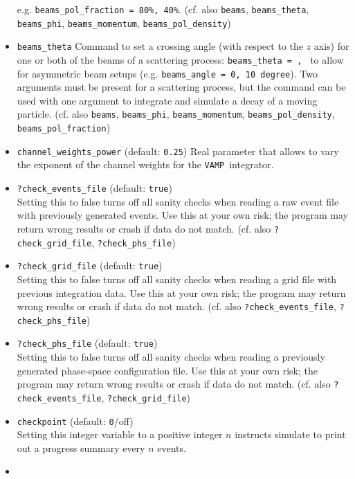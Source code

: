 \documentclass[12pt]{book}
\newcommand{\ttt}[1]{\texttt{#1}}
\newcommand{\vamp}{\texttt{VAMP}}
\begin{document}
\begin{itemize}
e.g. \ttt{beams\_pol\_fraction = 80\%, 40\%}. (cf. also \ttt{beams},
\ttt{beams\_theta}, \ttt{beams\_phi}, \ttt{beams\_momentum},
\ttt{beams\_pol\_density})
\item
\ttt{beams\_theta} \newline
Command to set a crossing angle (with respect to the $z$ axis) for one
or both of the beams of a 
scattering process: \ttt{beams\_theta = {\em <angle1>}, {\em <angle2>}} to allow 
for asymmetric beam setups (e.g. \ttt{beams\_angle = 0, 10
degree}). Two arguments must be present for a scattering process, but
the command can be used with one argument to integrate and simulate a
decay of a moving particle. (cf. also \ttt{beams}, \ttt{beams\_phi},
\ttt{beams\_momentum}, \ttt{beams\_pol\_density},
\ttt{beams\_pol\_fraction})
\item
\ttt{channel\_weights\_power} \qquad (default: \ttt{0.25}) \newline
Real parameter that allows to vary the exponent of the channel weights
for the \vamp\ integrator. 
\item
\ttt{?check\_events\_file} \qquad (default: \ttt{true}) \\
Setting this to false turns off all sanity checks when reading a raw
event file with previously generated events.  Use this at your own
risk; the program may return wrong results or crash if data do not
match. (cf. also \ttt{?check\_grid\_file}, \ttt{?check\_phs\_file})
\item
\ttt{?check\_grid\_file} \qquad (default: \ttt{true}) \\
Setting this to false turns off all sanity checks when reading a grid
file with previous integration data.  Use this at your own risk; the
program may return wrong results or crash if data do not
match. (cf. also \ttt{?check\_events\_file}, \ttt{?check\_phs\_file})
\item
\ttt{?check\_phs\_file}  \qquad (default: \ttt{true}) \\
Setting this to false turns off all sanity checks when reading a
previously generated phase-space configuration file.  Use this at your
own risk; the program may return wrong results or crash if data do not
match. (cf. also \ttt{?check\_events\_file}, \ttt{?check\_grid\_file})
\item
\ttt{checkpoint} \qquad (default: \ttt{0}/off) \\
Setting this integer variable to a positive integer $n$ instructs
simulate to print out a progress summary every $n$ events.
\item

\end{itemize}
\end{document}
